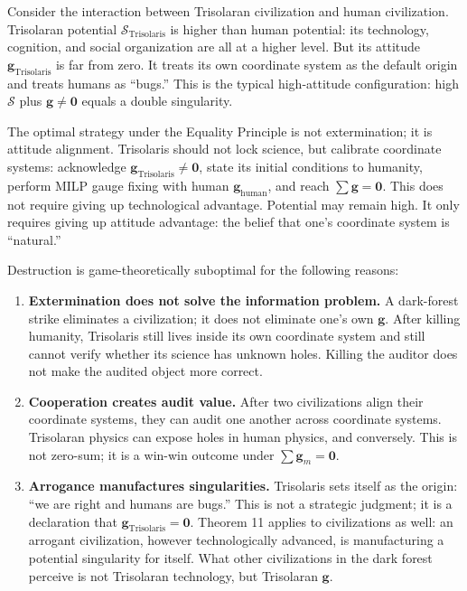 \documentclass[12pt,a4paper]{article}
\theoremstyle{remark}
\begin{document}
Consider the interaction between Trisolaran civilization and human civilization. Trisolaran potential $\mathcal{S}_{\text{Trisolaris}}$ is higher than human potential: its technology, cognition, and social organization are all at a higher level. But its attitude $\mathbf{g}_{\text{Trisolaris}}$ is far from zero. It treats its own coordinate system as the default origin and treats humans as ``bugs.'' This is the typical high-attitude configuration: high $\mathcal{S}$ plus $\mathbf{g} \neq \mathbf{0}$ equals a double singularity.

The optimal strategy under the Equality Principle is not extermination; it is attitude alignment. Trisolaris should not lock science, but calibrate coordinate systems: acknowledge $\mathbf{g}_{\text{Trisolaris}} \neq \mathbf{0}$, state its initial conditions to humanity, perform MILP gauge fixing with human $\mathbf{g}_{\text{human}}$, and reach $\sum\mathbf{g} = \mathbf{0}$. This does not require giving up technological advantage. Potential may remain high. It only requires giving up attitude advantage: the belief that one's coordinate system is ``natural.''

Destruction is game-theoretically suboptimal for the following reasons:

\begin{enumerate}
    \item \textbf{Extermination does not solve the information problem.} A dark-forest strike eliminates a civilization; it does not eliminate one's own $\mathbf{g}$. After killing humanity, Trisolaris still lives inside its own coordinate system and still cannot verify whether its science has unknown holes. Killing the auditor does not make the audited object more correct.
    \item \textbf{Cooperation creates audit value.} After two civilizations align their coordinate systems, they can audit one another across coordinate systems. Trisolaran physics can expose holes in human physics, and conversely. This is not zero-sum; it is a win-win outcome under $\sum\mathbf{g}_m = \mathbf{0}$.
    \item \textbf{Arrogance manufactures singularities.} Trisolaris sets itself as the origin: ``we are right and humans are bugs.'' This is not a strategic judgment; it is a declaration that $\mathbf{g}_{\text{Trisolaris}} = \mathbf{0}$. Theorem 11 applies to civilizations as well: an arrogant civilization, however technologically advanced, is manufacturing a potential singularity for itself. What other civilizations in the dark forest perceive is not Trisolaran technology, but Trisolaran $\mathbf{g}$.
\end{enumerate}
\end{document}
